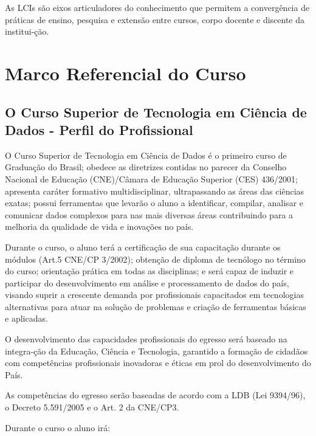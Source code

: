 \documentclass[a4paper, 12pt, openright, oneside, german, french, english, brazil]{abntex2}
\begin{document}
As LCIs são eixos articuladores do conhecimento que permitem a convergência de práticas de ensino, pesquisa e extensão entre cursos, corpo docente e discente da institui-ção.

\section{Marco Referencial do Curso}

\subsection{O Curso Superior de Tecnologia em Ciência de Dados - Perfil do Profissional}

O Curso Superior de Tecnologia em Ciência de Dados é o primeiro curso de Graduação do Brasil; obedece as diretrizes contidas no parecer da Conselho Nacional de Educação (CNE)/Câmara de Educação Superior (CES) 436/2001; apresenta caráter formativo multidisciplinar, ultrapassando as áreas das ciências exatas; possui ferramentas que levarão o aluno a identificar, compilar, analisar e comunicar dados complexos para nas mais diversas áreas contribuindo para a melhoria da qualidade de vida e inovações no país.

Durante o curso, o aluno terá a certificação de sua capacitação durante os módulos (Art.5 CNE/CP 3/2002); obtenção de diploma de tecnólogo no término do curso; orientação prática em todas as disciplinas; e será capaz de induzir e participar do desenvolvimento em análise e processamento de dados do país, visando suprir a crescente demanda por profissionais capacitados em tecnologias alternativas para atuar na solução de problemas e criação de ferramentas básicas e aplicadas.

O desenvolvimento das capacidades profissionais do egresso será baseado na integra-ção da Educação, Ciência e Tecnologia, garantido a formação de cidadãos com competências profissionais inovadoras e éticas em prol do desenvolvimento do País.

As competências do egresso serão baseadas de acordo com a LDB (Lei 9394/96), o Decreto 5.591/2005 e o Art. 2 da CNE/CP3.

Durante o curso o aluno irá:
\end{document}

